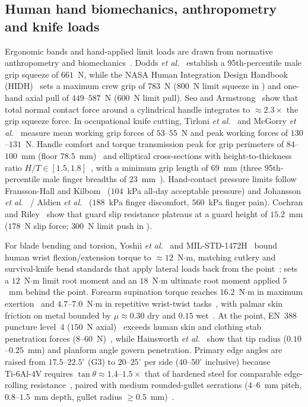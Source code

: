 \subsection{Human hand biomechanics, anthropometry and knife loads}
Ergonomic bands and hand-applied limit loads are drawn from normative anthropometry and biomechanics~\cite{ansur2,faa-hfds,hidh,mil1472h,niosh2004}.
Dodds \emph{et al.}~\cite{dodds2014} establish a 95th-percentile male grip squeeze of $661$~N, while the NASA Human
Integration Design Handbook (HIDH)~\cite{hidh} sets a maximum crew grip of $783$~N ($800$~N limit squeeze in
) and one-hand axial pull of $449$--$587$~N ($600$~N limit pull). Seo and Armstrong~\cite{seo2008hf}
show that total normal contact force around a cylindrical handle integrates to $\approx 2.3\times$ the grip squeeze force.
In occupational knife cutting, Tirloni \emph{et al.}~\cite{tirloni2021} and McGorry \emph{et al.}~\cite{mcgorry2005} measure
mean working grip forces of $53$--$55$~N and peak working forces of $130$--$131$~N. Handle comfort and torque transmission
peak for grip perimeters of $84$--$100$~mm (floor $78.5$~mm)~\cite{kong2005} and elliptical cross-sections with
height-to-thickness ratio $H/T \in [1.5, 1.8]$~\cite{seo2011}, with a minimum grip length of $69$~mm (three 95th-percentile
male finger breadths of $23$~mm~\cite{faa-hfds}). Hand-contact pressure limits follow Fransson-Hall and Kilbom~\cite{fransson1993}
($104$~kPa all-day acceptable pressure) and Johansson \emph{et al.}~\cite{johansson1999} / Aldien \emph{et al.}~\cite{aldien2005}
($188$~kPa finger discomfort, $560$~kPa finger pain). Cochran and Riley~\cite{cochran1986} show that guard slip resistance
plateaus at a guard height of $15.2$~mm ($178$~N slip force; $300$~N limit push in ).

For blade bending and torsion, Yoshii \emph{et al.}~\cite{yoshii2015} and MIL-STD-1472H~\cite{mil1472h} bound human wrist
flexion/extension torque to $\approx 12$~N$\cdot$m, matching cutlery and survival-knife bend standards that apply lateral
loads back from the point~\cite{gost51501,mil8662e};  sets a $12$~N$\cdot$m limit root moment and an
$18$~N$\cdot$m ultimate root moment applied $5$~mm behind the point. Forearm supination torque reaches $16.2$~N$\cdot$m in
maximum exertion~\cite{osullivan2002} and $4.7$--$7.0$~N$\cdot$m in repetitive wrist-twist tasks~\cite{kong2007,en8442},
with palmar skin friction on metal bounded by $\mu \approx 0.30$ dry and $0.15$ wet~\cite{buchholz1988}. At the point,
EN~388 puncture level~4 ($150$~N axial)~\cite{en388} exceeds human skin and clothing stab penetration forces ($8$--$60$~N)~\cite{gilchrist2008,nolan2013},
while Hainsworth \emph{et al.}~\cite{hainsworth2008} show that tip radius ($0.10$--$0.25$~mm) and planform angle govern
penetration. Primary edge angles are raised from $17.5$--$22.5^\circ$ (G3) to $20$--$25^\circ$ per side ($40$--$50^\circ$
inclusive) because $\mathrm{Ti\text{-}6Al\text{-}4V}$ requires $\tan\theta \approx 1.4$--$1.5\times$ that of hardened steel
for comparable edge-rolling resistance~\cite{thomas2018,zhang2023,landes2006,iso8442-5}, paired with medium rounded-gullet
serrations ($4$--$6$~mm pitch, $0.8$--$1.5$~mm depth, gullet radius $\ge 0.5$~mm)~\cite{us4823467,inglis1913}.


